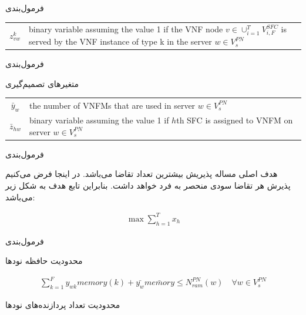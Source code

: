 \documentclass{beamer}
\begin{document}
\begin{persian}
\begin{frame}{فرمول‌بندی}
\begin{latin}
\begin{tabular}{c p{10cm}}
        $z^k_{vw}$ & binary variable assuming the value 1 if the VNF node $v \in \cup_{i=1}^{T} V_{i, F}^{SFC}$ is served by the VNF instance of type k in the server $w \in V_s^{PN}$ \\
    \end{tabular}\end{latin}
\end{frame}
\begin{frame}{فرمول‌بندی} %
    \par
    متغیرهای تصمیم‌گیری
    \begin{latin}\begin{tabular}{c p{10cm}}
        $\bar{y}_w$ & the number of VNFMs that are used in server $w \in V_s^{PN}$\\
        $\bar{z}_{hw}$ & binary variable assuming the value 1 if $h$th SFC is assigned to VNFM on server $w \in V_s^{PN}$\\
    \end{tabular}\end{latin}
\end{frame}
\begin{frame}{فرمول‌بندی} %
    \par
    هدف اصلی مساله پذیریش بیشترین تعداد تقاضا می‌باشد.
    در اینجا فرض می‌کنیم پذیرش هر تقاضا سودی منحصر به فرد خواهد داشت.
    بنابراین تابع هدف به شکل زیر می‌باشد:
    \begin{latin}\begin{align}
    \max \sum_{h=1}^T x_h
    \end{align}\end{latin}
\end{frame}
\begin{frame}{فرمول‌بندی} %
    \par
    محدودیت حافظه نودها
    \begin{latin}\begin{align}
    \sum_{k=1}^F y_{wk} memory(k) + \bar{y_w} \bar{memory} \le N_{ram}^{PN}(w)
    \quad
    \forall w \in V_s^{PN}
    \end{align}\end{latin}
    \par
    محدودیت تعداد پردازنده‌های نودها
    \begin{latin}\begin{align}

\end{align}
\end{latin}
\end{frame}
\end{persian}
\end{document}
